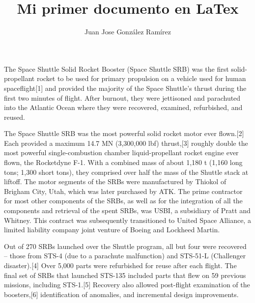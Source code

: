 \documentclass{article}
\title{Mi primer documento en LaTex} %
\author{Juan Jose González Ramírez}
\begin{document}
\maketitle %
The Space Shuttle Solid Rocket Booster (Space Shuttle SRB) was the first solid-propellant rocket to be used for primary propulsion on a vehicle used for human spaceflight[1] and provided the majority of the Space Shuttle's thrust during the first two minutes of flight. After burnout, they were jettisoned and parachuted into the Atlantic Ocean where they were recovered, examined, refurbished, and reused.

The Space Shuttle SRB was the most powerful solid rocket motor ever flown.[2] Each provided a maximum 14.7 MN (3,300,000 lbf) thrust,[3] roughly double the most powerful single-combustion chamber liquid-propellant rocket engine ever flown, the Rocketdyne F-1. With a combined mass of about 1,180 t (1,160 long tons; 1,300 short tons), they comprised over half the mass of the Shuttle stack at liftoff. The motor segments of the SRBs were manufactured by Thiokol of Brigham City, Utah, which was later purchased by ATK. The prime contractor for most other components of the SRBs, as well as for the integration of all the components and retrieval of the spent SRBs, was USBI, a subsidiary of Pratt and Whitney. This contract was subsequently transitioned to United Space Alliance, a limited liability company joint venture of Boeing and Lockheed Martin.

Out of 270 SRBs launched over the Shuttle program, all but four were recovered – those from STS-4 (due to a parachute malfunction) and STS-51-L (Challenger disaster).[4] Over 5,000 parts were refurbished for reuse after each flight. The final set of SRBs that launched STS-135 included parts that flew on 59 previous missions, including STS-1.[5] Recovery also allowed post-flight examination of the boosters,[6] identification of anomalies, and incremental design improvements.
\end{document}
